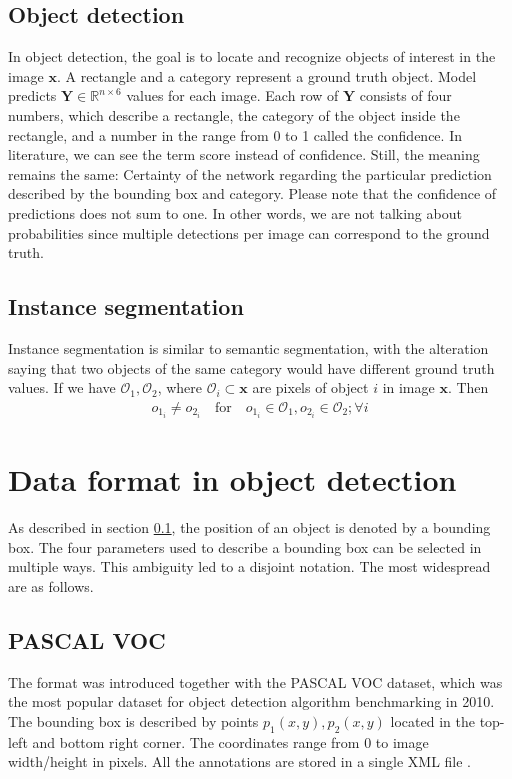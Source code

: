 \subsection{Object detection}
\label{subsec:object_detection}
In object detection, the goal is to locate and recognize objects of interest in the image $\mathbf{x}$. A rectangle and a category represent a ground truth object. Model predicts $\mathbf{Y} \in \mathbb{R}^{n \times 6}$ values for each image. Each row of $\mathbf{Y}$ consists of four numbers, which describe a rectangle, the category of the object inside the rectangle, and a number in the range from 0 to 1 called the confidence. In literature, we can see the term score instead of confidence. Still, the meaning remains the same: Certainty of the network regarding the particular prediction described by the bounding box and category. Please note that the confidence of predictions does not sum to one. In other words, we are not talking about probabilities since multiple detections per image can correspond to the ground truth.

\subsection{Instance segmentation}
Instance segmentation is similar to semantic segmentation, with the alteration saying that two objects of the same category would have different ground truth values. If we have $\mathcal{O}_1, \mathcal{O}_2$, where $\mathcal{O}_i \subset \mathbf{x}$ are pixels of object $i$ in image $\mathbf{x}$. Then
\begin{align}
    o_{1_i} \neq o_{2_i} \quad \text{for} \quad o_{1_i} \in \mathcal{O}_1, o_{2_i} \in \mathcal{O}_2;\forall i
\end{align}

\section{Data format in object detection}
As described in section \ref{subsec:object_detection}, the position of an object is denoted by a bounding box.  The four parameters used to describe a bounding box can be selected in multiple ways. This ambiguity led to a disjoint notation. The most widespread are as follows.
\subsection{PASCAL VOC}
The format was introduced together with the PASCAL VOC dataset, which was the most popular dataset for object detection algorithm benchmarking in 2010. The bounding box is described by points $p_1(x,y),p_2(x,y)$ located in the top-left and bottom right corner. The coordinates range from 0 to image width/height in pixels. All the annotations are stored in a single XML file \cite{Everingham2009,Padilla2021}.
